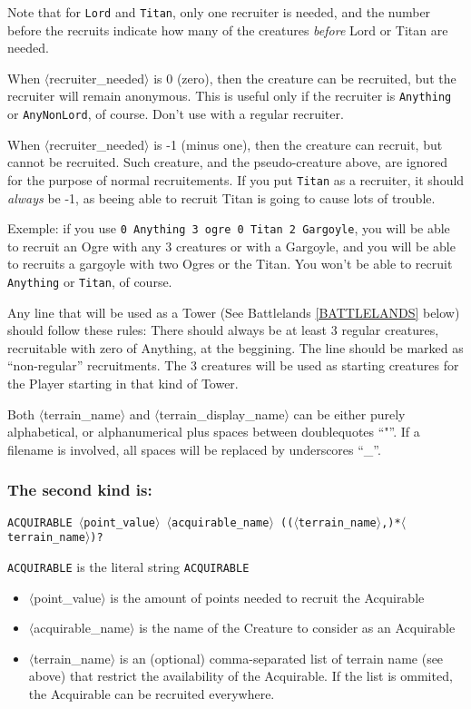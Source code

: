 \documentclass{article}
\begin{document}
Note that for \texttt{Lord} and \texttt{Titan}, only one recruiter is needed, and the number before the recruits indicate how many of the creatures \emph{before} Lord or Titan are needed.

When $\langle$recruiter\_needed$\rangle$ is 0 (zero), then the creature can be recruited, but the recruiter will remain anonymous. This is useful only if the recruiter is \texttt{Anything} or \texttt{AnyNonLord}, of course. Don't use with a regular recruiter.

When $\langle$recruiter\_needed$\rangle$ is -1 (minus one), then the creature can recruit, but cannot be recruited. Such creature, and the pseudo-creature above, are ignored for the purpose of normal recruitements. If you put \texttt{Titan} as a recruiter, it should \emph{always} be -1, as beeing able to recruit Titan is going to cause lots of trouble.

Exemple: if you use \texttt{0 Anything 3 ogre 0 Titan 2 Gargoyle}, you will be able to recruit an Ogre with any 3 creatures or with a Gargoyle, and you will be able to recruits a gargoyle with two Ogres or the Titan. You won't be able to recruit \texttt{Anything} or \texttt{Titan}, of course.

Any line that will be used as a Tower (See Battlelands \ref{BATTLELANDS} below) should follow these rules: There should always be at least 3 regular creatures, recruitable with zero of Anything, at the beggining. The line should be marked as ``non-regular'' recruitments. The 3 creatures will be used as starting creatures for the Player starting in that kind of Tower.

Both $\langle$terrain\_name$\rangle$ and $\langle$terrain\_display\_name$\rangle$ can be either purely alphabetical, or alphanumerical plus spaces between doublequotes ``"''. If a filename is involved, all spaces will be replaced by underscores ``\_''.

\subsubsection*{The second kind is:}

\texttt{\texttt{ACQUIRABLE} $\langle$point\_value$\rangle$ $\langle$acquirable\_name$\rangle$ (($\langle$terrain\_name$\rangle$,)*$\langle$terrain\_name$\rangle$)?}

\texttt{ACQUIRABLE} is the literal string \texttt{ACQUIRABLE}

\begin{itemize}
\item $\langle$point\_value$\rangle$ is the amount of points needed to recruit the Acquirable
\item $\langle$acquirable\_name$\rangle$ is the name of the Creature to consider as an Acquirable
\item $\langle$terrain\_name$\rangle$ is an (optional) comma-separated list of terrain name (see above) that restrict the availability of the Acquirable. If the list is ommited, the Acquirable can be recruited everywhere.
\end{itemize}
\end{document}
